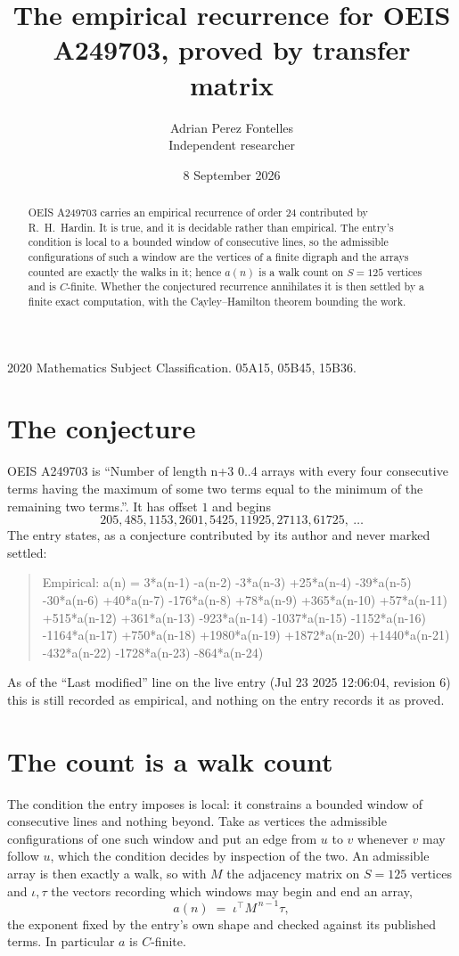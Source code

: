 \documentclass[11pt,a4paper]{article}
\title{The empirical recurrence for OEIS A249703, proved by transfer matrix}
\author{Adrian Perez Fontelles\\ \small Independent researcher}
\date{8 September 2026}
\theoremstyle{plain}
\theoremstyle{definition}
\begin{document}
\maketitle

\begin{abstract}
OEIS A249703 carries an empirical recurrence of order $24$ contributed by R.~H.~Hardin. It is
true, and it is decidable rather than empirical. The entry's condition is local to a bounded window of consecutive lines, so
the admissible configurations of such a window are the vertices of a finite digraph and the
arrays counted are exactly the walks in it; hence $a(n)$ is a walk count on $S=125$ vertices
and is $C$-finite. Whether the conjectured recurrence annihilates it is then settled by a
finite exact computation, with the Cayley--Hamilton theorem bounding the work.
\end{abstract}

\noindent\small 2020 Mathematics Subject Classification. 05A15, 05B45, 15B36.\normalsize

\section{The conjecture}

OEIS A249703 is ``Number of length n+3 0..4 arrays with every four consecutive terms having the maximum of some two terms equal to the minimum of the remaining two terms.''. It has offset $1$ and begins
\[
205, 485, 1153, 2601, 5425, 11925, 27113, 61725,\ \dots
\]
The entry states, as a conjecture contributed by its author and never marked settled:
\begin{quote}
Empirical: a(n) = 3*a(n-1) -a(n-2) -3*a(n-3) +25*a(n-4) -39*a(n-5) -30*a(n-6) +40*a(n-7) -176*a(n-8) +78*a(n-9) +365*a(n-10) +57*a(n-11) +515*a(n-12) +361*a(n-13) -923*a(n-14) -1037*a(n-15) -1152*a(n-16) -1164*a(n-17) +750*a(n-18) +1980*a(n-19) +1872*a(n-20) +1440*a(n-21) -432*a(n-22) -1728*a(n-23) -864*a(n-24)
\end{quote}
As of the ``Last modified'' line on the live entry (Jul 23 2025 12:06:04, revision 6) this is still
recorded as empirical, and nothing on the entry records it as proved.

\section{The count is a walk count}

The condition the entry imposes is local: it constrains a bounded window of consecutive lines and nothing beyond. Take as
vertices the admissible configurations of one such window and put an edge from $u$ to $v$
whenever $v$ may follow $u$, which the condition decides by inspection of the two. An
admissible array is then exactly a walk, so with $M$ the adjacency matrix on $S=125$ vertices
and $\iota,\tau$ the vectors recording which windows may begin and end an array,
\[
a(n)\;=\;\iota^{\!\top}M^{\,n-1}\tau ,
\]
the exponent fixed by the entry's own shape and checked against its published terms. In
particular $a$ is $C$-finite.
\end{document}
